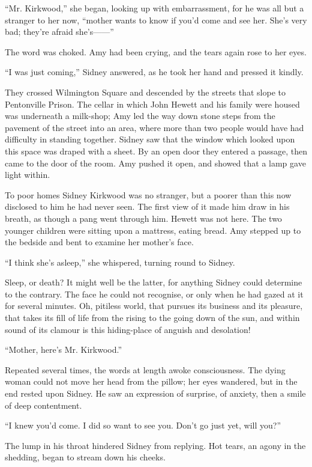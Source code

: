 ``Mr. Kirkwood,'' she began, looking up with embarrassment, for he was
all but a stranger to her now, ``mother wants to know if you'd come and
see her. She's very bad; they're afraid {she's{{------}}''}

The word was choked. Amy had been crying, and the tears again rose to
her eyes.

``I was just coming,'' Sidney answered, as he took her hand and pressed
it kindly.

They crossed Wilmington Square and descended by the streets that slope
to Pentonville Prison. The cellar in which John Hewett and his family
were housed was underneath a milk-shop; Amy led the way down stone steps
from the pavement of the street into an area, where more than two people
would have had difficulty in standing together. Sidney saw that the
window which looked upon this space was draped with a {}sheet. By an
open door they entered a passage, then came to the door of the room. Amy
pushed it open, and showed that a lamp gave light within.

To poor homes Sidney Kirkwood was no stranger, but a poorer than this
now disclosed to him he had never seen. The first view of it made him
draw in his breath, as though a pang went through him. Hewett was not
here. The two younger children were sitting upon a mattress, eating
bread. Amy stepped up to the bedside and bent to examine her mother's
face.

``I think she's asleep,'' she whispered, turning round to Sidney.

Sleep, or death? It might well be the latter, for anything Sidney could
determine to the contrary. The face he could not recognise, or only when
he had gazed at it for several minutes. Oh, pitiless world, that pursues
its business and its pleasure, that takes its fill of life from the
rising to the going down of the sun, and within sound of its clamour is
this hiding-place of anguish and desolation!

{}``Mother, here's Mr. Kirkwood.''

Repeated several times, the words at length awoke consciousness. The
dying woman could not move her head from the pillow; her eyes wandered,
but in the end rested upon Sidney. He saw an expression of surprise, of
anxiety, then a smile of deep contentment.

``I knew you'd come. I did so want to see you. Don't go just yet, will
you?''

The lump in his throat hindered Sidney from replying. Hot tears, an
agony in the shedding, began to stream down his cheeks.

